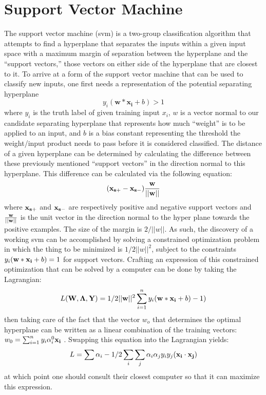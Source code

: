 \section{Support Vector Machine}
The support vector machine (svm) is a two-group classification algorithm that attempts
to find a hyperplane that separates the inputs within a given input space
with a maximum margin of separation between the hyperplane and the
``support vectors,'' those vectors on either side of the hyperplane
that are closest to it. To arrive at a form of the support vector machine that
can be used to classify new inputs, one first needs a representation of the
potential separating hyperplane $$y_i(\mathbf{w}*\mathbf{x_i} + b) > 1$$ where
$y_i$ is the truth label of given training input $x_i$, $w$ is a vector
normal to our candidate separating hyperplane that represents how much
``weight'' is to be applied to an input, and $b$ is a bias constant representing
the threshold the weight/input product needs to pass before it is considered
classified. The distance of a given hyperplane can be determined by calculating
the difference between these previously mentioned ``support vectors'' in the
direction normal to this hyperplane. This difference can be calculated via the
following equation:
$$(\bold{x_{s+}}-\bold{x_{s-}})\bold{\frac{w}{||w||}}$$ where $\bold{x_{s+}}$
and $\bold{x_{s-}}$ are respectively positive and negative support vectors and
$\bold{\frac{w}{||w||}}$ is the unit vector in the direction normal to the hyper
plane towards the positive examples. The size of the margin is $2/||w||$. As
such, the discovery of a working svm can be accomplished by solving a constrained
optimization problem in which the thing to be minimized is $1/2||w||^2$, subject
to the constraints $y_i(\bold{w}*\bold{x_i} + b) = 1$ for support vectors.
Crafting an expression of this constrained optimization that can be solved by a
computer can be done by taking the Lagrangian:
$$L(\bold{W},\bold{\Lambda}, \bold{Y}) = 1/2||\bold{w}||^2 \sum_{i=1}^{n}y_i(\bold{w}*\bold{x_i}+b)-1)$$
then taking care of the fact that the vector $w_o$ that determines the optimal
hyperplane can be written as a linear combination of the training vectors:
$w_{0}=\sum_{i=1}^{n}y_{i}\alpha_{i}^{0}\bold{x_i}$ \cite{Vapnik}. Swapping this
equation into the Lagrangian yields:
$$L = \sum \alpha_{i} - 1/2 \sum_{i}\sum_{j}\alpha_{i}\alpha_{j}y_{i}y_{j}(\bold{x_i}\cdot\bold{x_j})$$
at which point one should consult their closest computer so that it can maximize
this expression.

